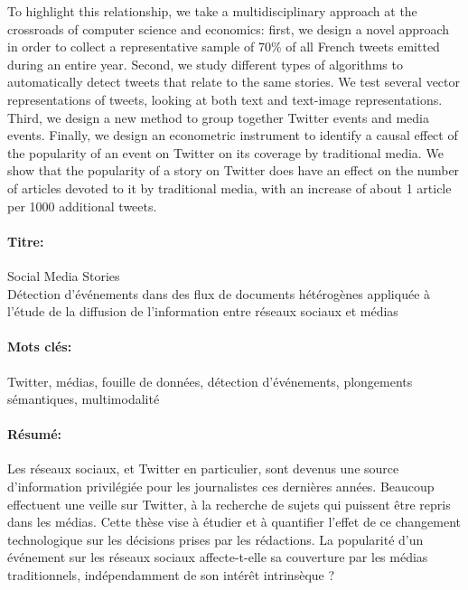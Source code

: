 \begin{singlespace}
\begin{mdframed}[linecolor=Prune,linewidth=1]
\begin{multicols}{2}
To highlight this relationship, we take a multidisciplinary approach at the crossroads of computer science and economics: first, we design a novel approach in order to collect a representative sample of 70\% of all French tweets emitted during an entire year. Second, we study different types of algorithms to automatically detect tweets that relate to the same stories. We test several vector representations of tweets, looking at both text and text-image representations. Third, we design a new method to group together Twitter events and media events. Finally, we design an econometric instrument to identify a causal effect of the popularity of an event on Twitter on its coverage by traditional media. We show that the popularity of a story on Twitter does have an effect on the number of articles devoted to it by traditional media, with an increase of about 1 article per 1000 additional tweets.
\end{multicols}
\smallskip
\end{mdframed}

\begin{mdframed}[linecolor=Prune,linewidth=1]
\vspace{-.25cm}
\paragraph*{Titre:} Social Media Stories\\
Détection d'événements dans des flux de documents hétérogènes appliquée à l'étude de la diffusion de l'information entre réseaux sociaux et médias

\vspace{-.25cm}
\paragraph*{Mots clés:} Twitter, médias, fouille de données, détection d'événements, plongements sémantiques, multimodalité

\vspace{-.5cm}
\begin{multicols}{2}
\paragraph*{Résumé:} Les réseaux sociaux, et Twitter en particulier, sont devenus une source d'information privilégiée pour les journalistes ces dernières années. Beaucoup effectuent une veille sur Twitter, à la recherche de sujets qui puissent être repris dans les médias. Cette thèse vise à étudier et à quantifier l'effet de ce changement technologique sur les décisions  prises par les rédactions. La popularité d’un événement sur les réseaux sociaux affecte-t-elle sa couverture par les médias traditionnels, indépendamment de son intérêt intrinsèque ?


\end{multicols}
\end{mdframed}
\end{singlespace}
